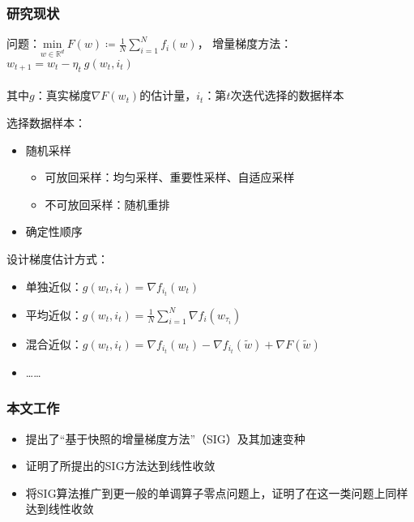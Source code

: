 \frame
{
\frametitle{研究现状}
\footnotesize
问题：$\underset{w \in \mathbb{R}^d}{\mathrm{min}} \ F(w) \coloneqq \frac{1}{N} \sum_{i=1}^N f_i(w) $， \pause 增量梯度方法：$w_{t+1} = w_t - \eta_t \ g(w_t, i_t)$ \\~\\
\pause 其中$g$：真实梯度$\nabla F(w_t)$的估计量，$i_t$：第$t$次迭代选择的数据样本

\pause

\begin{block}{}
选择数据样本：
\begin{itemize}
    \item 随机采样
    \begin{itemize}
        \item \alert<6>{可放回采样}：均匀采样、重要性采样、自适应采样
        \item 不可放回采样：随机重排
    \end{itemize}
    \item 确定性顺序
\end{itemize}
\end{block}

\pause

\begin{block}{}
设计梯度估计方式：
\begin{itemize}
    \item 单独近似：$g(w_t, i_t) = \nabla f_{i_t}(w_t)$
    \item \alert<6>{平均近似}：$g(w_t, i_t) = \frac{1}{N}\sum_{i=1}^N\nabla f_i(w_{\tau_i})$
    \item \alert<6>{混合近似}：$g(w_t, i_t) = \nabla f_{i_t}(w_t) - \nabla f_{i_t}(\tilde{w}) + \nabla F(\tilde{w})$
    \item \alert<6>{……}
\end{itemize}
\end{block}

}

\frame
{
\frametitle{本文工作}
\begin{itemize}
  \item 提出了“基于快照的增量梯度方法”（SIG）及其加速变种 \vspace*{1em}
  \item 证明了所提出的SIG方法达到线性收敛 \vspace*{1em}
  \item 将SIG算法推广到更一般的单调算子零点问题上，证明了在这一类问题上同样达到线性收敛
\end{itemize}
}

\miniframeson
